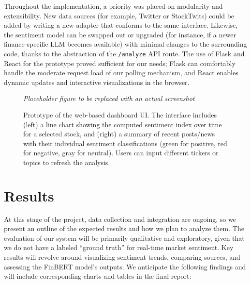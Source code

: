 \documentclass[12pt]{article}
\begin{document}
Throughout the implementation, a priority was placed on modularity and extensibility. New data sources (for
example, Twitter or StockTwits) could be added by writing a new adapter that conforms to the same interface.
Likewise, the sentiment model can be swapped out or upgraded (for instance, if a newer finance-specific LLM
becomes available) with minimal changes to the surrounding code, thanks to the abstraction of the
\texttt{/analyze} API route. The use of Flask and React for the prototype proved sufficient for our needs;
Flask can comfortably handle the moderate request load of our polling mechanism, and React enables dynamic
updates and interactive visualizations in the browser.

\begin{figure}[h]
  \centering
  \textit{Placeholder figure to be replaced with an actual screenshot}
  \caption{Prototype of the web-based dashboard UI. The interface includes (left) a line chart showing the
           computed sentiment index over time for a selected stock, and (right) a summary of recent
           posts/news with their individual sentiment classifications (green for positive, red for negative,
           gray for neutral). Users can input different tickers or topics to refresh the analysis.}
  \label{fig:ui}
\end{figure}


\section{Results}
At this stage of the project, data collection and integration are ongoing, so we present an outline of the
expected results and how we plan to analyze them. The evaluation of our system will be primarily qualitative
and exploratory, given that we do not have a labeled “ground truth” for real-time market sentiment. Key
results will revolve around visualizing sentiment trends, comparing sources, and assessing the FinBERT
model's outputs. We anticipate the following findings and will include corresponding charts and tables in
the final report:
\end{document}
